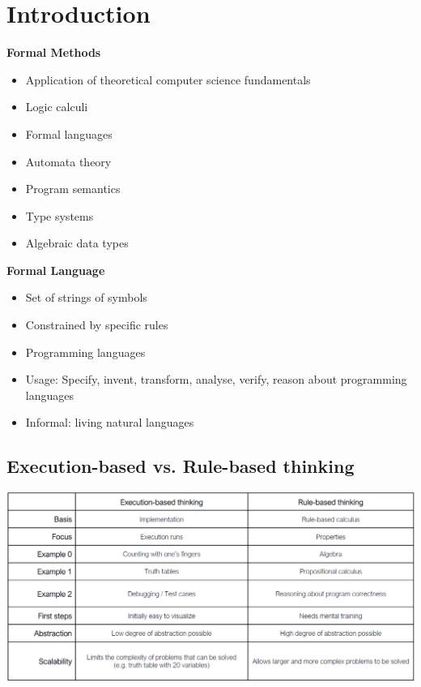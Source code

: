 
\section{Introduction}
\textbf{Formal Methods}
\begin{itemize}
    \item Application of theoretical computer science fundamentals
    \item Logic calculi
    \item Formal languages
    \item Automata theory
    \item Program semantics
    \item Type systems
    \item Algebraic data types
\end{itemize}

\textbf{Formal Language}
\begin{itemize}
    \item Set of strings of symbols
    \item Constrained by specific rules
    \item Programming languages
    \item Usage: Specify, invent, transform, analyse, verify, reason about programming languages
    \item Informal: living natural languages
\end{itemize}

\subsection{Execution-based vs. Rule-based thinking}
\includegraphics[width=\linewidth]{img/execution_rule_thinking.png}

